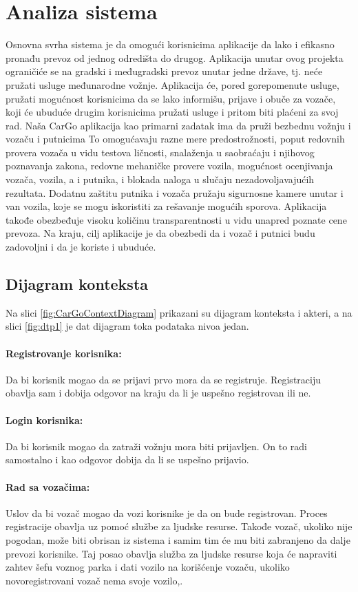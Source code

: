 \section{\bfseries Analiza sistema}

Osnovna svrha sistema je da omogući korisnicima aplikacije da lako i efikasno pronađu prevoz od jednog odredišta do drugog. Aplikacija unutar ovog projekta ograničiće se na gradski i međugradski prevoz unutar jedne države, tj. neće pružati usluge međunarodne vožnje. Aplikacija će, pored gorepomenute usluge, pružati mogućnost korisnicima da se lako informišu, prijave i obuče za vozače, koji će ubuduće drugim korisnicima pružati usluge i pritom biti plaćeni za svoj rad. Naša CarGo aplikacija kao primarni zadatak ima da pruži bezbednu vožnju i vozaču i putnicima To omogućavaju razne mere predostrožnosti, poput redovnih provera vozača u vidu testova ličnosti, snalaženja u saobraćaju i njihovog poznavanja zakona, redovne mehaničke provere vozila, mogućnost ocenjivanja vozača, vozila, a i putnika, i blokada naloga u slučaju nezadovoljavajućih rezultata. Dodatnu zaštitu putnika i vozača pružaju sigurnosne kamere unutar i van vozila, koje se mogu iskoristiti za rešavanje mogućih sporova. Aplikacija takođe obezbeđuje visoku količinu transparentnosti u vidu unapred poznate cene prevoza. Na kraju, cilj aplikacije je da obezbedi da i vozač i putnici budu zadovoljni i da je koriste i ubuduće.
     
\subsection{\bfseries Dijagram konteksta}

\quad Na slici \ref{fig:CarGoContextDiagram} prikazani su dijagram konteksta i akteri, a na slici \ref{fig:dtp1} je dat dijagram toka podataka nivoa jedan.
\paragraph{Registrovanje korisnika:}
    Da bi korisnik mogao da se prijavi prvo mora da se registruje. Registraciju obavlja sam i dobija odgovor na kraju da li je uspešno registrovan ili ne.
\paragraph{Login korisnika:}
    Da bi korisnik mogao da zatraži vožnju mora biti prijavljen. On to radi samostalno i kao odgovor dobija da li se uspešno prijavio.
\paragraph{Rad sa vozačima:}
    Uslov da bi vozač mogao da vozi korisnike je da on bude registrovan. Proces registracije obavlja uz pomoć službe za ljudske resurse. Takođe vozač, ukoliko nije pogodan, može biti obrisan iz sistema i samim tim će mu biti zabranjeno da dalje prevozi korisnike. Taj posao obavlja služba za ljudske resurse koja će napraviti zahtev šefu voznog parka i dati vozilo na korišćenje vozaču, ukoliko novoregistrovani vozač nema svoje vozilo,.
